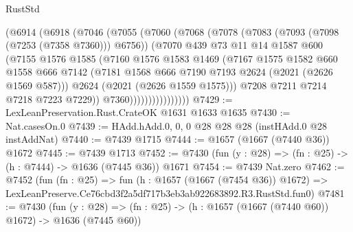 \begin{lexlean}{RustStd}
\begin{coremodule}
                    (@6914
                      (@6918
                        (@7046
                          (@7055
                            (@7060
                              (@7068
                                (@7078
                                  (@7083 (@7093 (@7098 (@7253 (@7358 @7360))) @6756))
                                  (@7070
                                    @439
                                    @73
                                    @11
                                    @14
                                    @1587
                                    @600
                                    (@7155
                                      @1576
                                      @1585
                                      (@7160
                                        @1576
                                        @1583
                                        @1469
                                        (@7167
                                          @1575
                                          @1582
                                          @660
                                          @1558
                                          @666
                                          @7142
                                          (@7181
                                            @1568
                                            @666
                                            @7190
                                            @7193
                                            @2624
                                            (@2021 (@2626 @1569 @587)))
                                          @2624
                                          (@2021 (@2626 @1559 @1575)))
                                        @7208
                                        @7211
                                        @7214
                                        @7218
                                        @7223
                                        @7229))
                                    @7360))))))))))))))))
@7429 := LexLeanPreservation.Rust.CrateOK @1631 @1633 @1635
@7430 := Nat.casesOn.{0}
@7439 := HAdd.hAdd.{0, 0, 0} @28 @28 @28 (instHAdd.{0} @28 instAddNat)
@7440 := @7439 @1715
@7444 := @1657 (@1667 (@7440 @36)) @1672
@7445 := @7439 @1713
@7452 := @7430 (fun (y : @28) => (fn : @25) -> (h : @7444) -> @1636 (@7445 @36)) @1671
@7454 := @7439 Nat.zero
@7462 := @7452
    (fun (fn : @25) =>
    fun (h : @1657 (@1667 (@7454 @36)) @1672) =>
    LexLeanPreserve.Ce76cbd3f2a5df717b3eb3ab922683892.R3.RustStd.fun0)
@7481 := @7430
    (fun (y : @28) => (fn : @25) -> (h : @1657 (@1667 (@7440 @60)) @1672) -> @1636 (@7445 @60))

\end{coremodule}
\end{lexlean}
